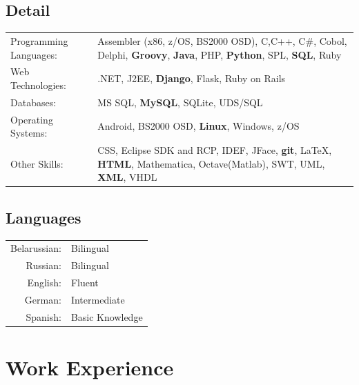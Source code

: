\documentclass[a4paper,12pt]{article}
\begin{document}
\subsection{Detail}
\hspace{0.75cm}
\begin{tabular}{lp{10cm}}
    Programming Languages:& \small Assembler (x86, z/OS, BS2000 OSD), C,C++, C\#, Cobol, Delphi, \textbf{Groovy}, \textbf{Java}, PHP, \textbf{Python}, SPL, \textbf{SQL}, Ruby \\ 
    Web Technologies:&\small .NET, J2EE, \textbf{Django}, Flask, Ruby on Rails\\ 
    Databases:&\small MS SQL, \textbf{MySQL}, SQLite, UDS/SQL\\ 
    Operating Systems:&\small Android, BS2000 OSD, \textbf{Linux}, Windows, z/OS\\ 
    Other Skills:&\small CSS, Eclipse SDK and RCP, IDEF, JFace, \textbf{git}, \LaTeX, \textbf{HTML}, Mathematica, Octave(Matlab), SWT, UML, \textbf{XML}, VHDL\\ 
\end{tabular} 

\subsection{Languages}
\hspace{0.75cm}
\begin{tabular}{rl}
    Belarussian: & Bilingual\\
    Russian: & Bilingual\\
    English: & Fluent\\
    German: & Intermediate\\
    Spanish: & Basic Knowledge\\
\end{tabular}

\section{Work Experience}
\end{document}
